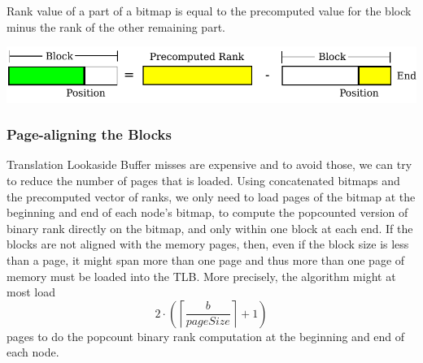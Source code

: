 \figureBegin
\caption{Rank value of a part of a bitmap is equal to the precomputed value for the block minus the rank of the other remaining part.}
\label{fig:PrecomputePopcountBlock}
\includegraphics[width=\textwidth]{PrecomputePopcountBlock.pdf}
\figureEnd








\subsubsection{Page-aligning the Blocks}
Translation Lookaside Buffer misses are expensive and to avoid those, we can try to reduce the number of pages that is loaded.
Using concatenated bitmaps and the precomputed vector of ranks, we only need to load pages of the bitmap at the beginning and end of each node's bitmap, to compute the popcounted version of binary rank directly on the bitmap, and only within one block at each end.
If the blocks are not aligned with the memory pages, then, even if the block size is less than a page, it might span more than one page and thus more than one page of memory must be loaded into the TLB.
More precisely, the algorithm might at most load \[2 \cdot \left( \left\lceil\frac{b}{\mathit{pageSize}}\right\rceil +1 \right)\] pages to do the popcount binary rank computation at the beginning and end of each node.

